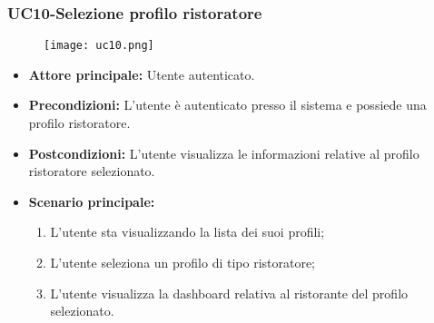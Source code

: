 \subsubsection{UC10-Selezione profilo ristoratore}
\begin{figure}[h] \texttt{[image: uc10.png]} \end{figure}
\begin{itemize}
\item \textbf{Attore principale:} Utente autenticato.
\item \textbf{Precondizioni:} L'utente è autenticato presso il sistema e possiede una profilo ristoratore.
\item \textbf{Postcondizioni:} L'utente visualizza le informazioni relative al profilo ristoratore selezionato.
\item \textbf{Scenario principale:}
\begin{enumerate}
    \item L'utente sta visualizzando la lista dei suoi profili;
    \item L'utente seleziona un profilo di tipo ristoratore;
    \item L'utente visualizza la dashboard relativa al ristorante del profilo selezionato.
\end{enumerate}
\end{itemize}

